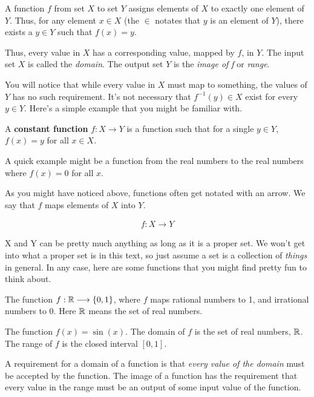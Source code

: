 \begin{definition}
A function $f$ from set $X$ to set $Y$ assigns elements of $X$ to exactly one element of $Y$. Thus, for any element $x \in X$ (the $\in$ notates that $y$ is an element of $Y$), there exists a $y \in Y$ such that $f(x) = y$. 
\end{definition}

Thus, every value in $X$ has a corresponding value, mapped by $f$, in $Y$. The input set $X$ is called the \textit{domain}. The output set $Y$ is the \textit{image of f} or \textit{range}.

You will notice that while every value in $X$ must map to something, the values of $Y$ has no such requirement. It's not necessary that $f^{-1}(y) \in X$ exist for every $y \in Y$. Here's a simple example that you might be familiar with.

\begin{definition}
    A \textbf{constant function} $f: X \longrightarrow Y$ is a function such that for a single $y \in Y$, $f(x) = y$ for all $x \in X$. 
\end{definition}

A quick example might be a function from the real numbers to the real numbers where $f(x) = 0$ for all $x$.

As you might have noticed above, functions often get notated with an arrow. We say that $f$ maps elements of $X$ into $Y$.  

\begin{align*}
    f: X \longrightarrow Y
\end{align*}

X and Y can be pretty much anything as long as it is a proper set. We won't get into what a proper set is in this text, so just assume a set is a collection of \textit{things} in general. In any case, here are some functions that you might find pretty fun to think about. 

\begin{example}
The function $f: \mathbb{R} \longrightarrow \{0, 1\}$, where $f$ maps rational numbers to 1, and irrational numbers to 0. Here $\mathbb{R}$ means the set of real numbers.
\end{example}

\begin{example}
The function $f(x) = \sin(x)$. The domain of $f$ is the set of real numbers, $\mathbb{R}$. The range of $f$ is the closed interval $[0, 1]$. 
\end{example}

A requirement for a domain of a function is that \textit{every value of the domain} must be accepted by the function. The image of a function has the requirement that every value in the range must be an output of some input value of the function. 

